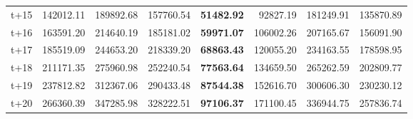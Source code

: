 \begin{table}[H]
\begin{tabular}{lrrrrrrr}
t+15  & 142012.11  & 189892.68  & 157760.54  & \textbf{51482.92}  & 92827.19  & 181249.91  & 135870.89  \\
t+16  & 163591.20  & 214640.19  & 185181.02  & \textbf{59971.07}  & 106002.26  & 207165.67  & 156091.90  \\
t+17  & 185519.09  & 244653.20  & 218339.20  & \textbf{68863.43}  & 120055.20  & 234163.55  & 178598.95  \\
t+18  & 211171.35  & 275960.98  & 252240.54  & \textbf{77563.64}  & 134659.50  & 265262.59  & 202809.77  \\
t+19  & 237812.82  & 312367.06  & 290433.48  & \textbf{87544.38}  & 152616.70  & 300606.30  & 230230.12  \\
t+20  & 266360.39  & 347285.98  & 328222.51  & \textbf{97106.37}  & 171100.45  & 336944.75  & 257836.74  \\

\bottomrule
\end{tabular}
\end{table}
